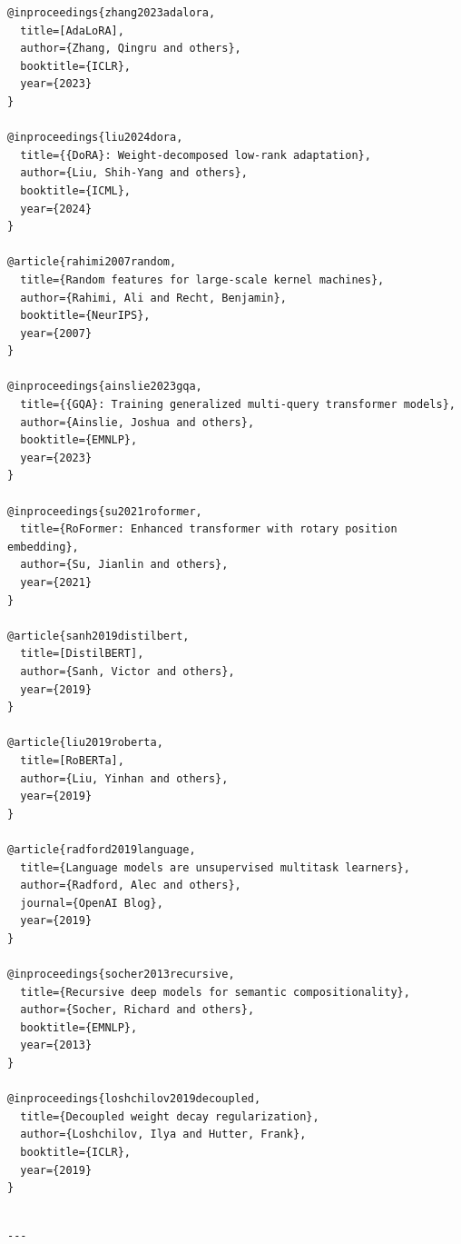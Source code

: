 \begin{lstlisting}
@inproceedings{zhang2023adalora,
  title=[AdaLoRA],
  author={Zhang, Qingru and others},
  booktitle={ICLR},
  year={2023}
}

@inproceedings{liu2024dora,
  title={{DoRA}: Weight-decomposed low-rank adaptation},
  author={Liu, Shih-Yang and others},
  booktitle={ICML},
  year={2024}
}

@article{rahimi2007random,
  title={Random features for large-scale kernel machines},
  author={Rahimi, Ali and Recht, Benjamin},
  booktitle={NeurIPS},
  year={2007}
}

@inproceedings{ainslie2023gqa,
  title={{GQA}: Training generalized multi-query transformer models},
  author={Ainslie, Joshua and others},
  booktitle={EMNLP},
  year={2023}
}

@inproceedings{su2021roformer,
  title={RoFormer: Enhanced transformer with rotary position embedding},
  author={Su, Jianlin and others},
  year={2021}
}

@article{sanh2019distilbert,
  title=[DistilBERT],
  author={Sanh, Victor and others},
  year={2019}
}

@article{liu2019roberta,
  title=[RoBERTa],
  author={Liu, Yinhan and others},
  year={2019}
}

@article{radford2019language,
  title={Language models are unsupervised multitask learners},
  author={Radford, Alec and others},
  journal={OpenAI Blog},
  year={2019}
}

@inproceedings{socher2013recursive,
  title={Recursive deep models for semantic compositionality},
  author={Socher, Richard and others},
  booktitle={EMNLP},
  year={2013}
}

@inproceedings{loshchilov2019decoupled,
  title={Decoupled weight decay regularization},
  author={Loshchilov, Ilya and Hutter, Frank},
  booktitle={ICLR},
  year={2019}
}
\end{lstlisting}
\begin{lstlisting}

---
\end{lstlisting}